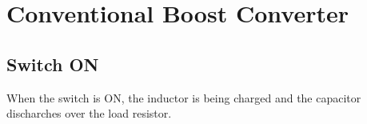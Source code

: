 \section{Conventional Boost Converter}\label{ch:CBC}

\subsection{Switch ON}\label{sec:SON}

When the switch is ON, the inductor is being charged and the capacitor discharches over the load resistor.

